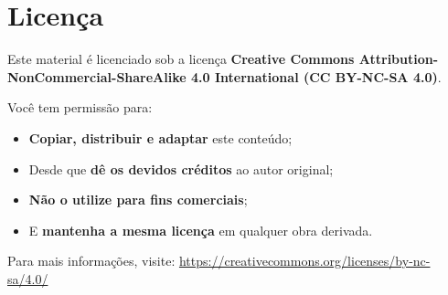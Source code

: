 \documentclass[12pt]{book}
\begin{document}
	\newpage
	\section*{Licença \faCreativeCommons}
	
	Este material é licenciado sob a licença \textbf{Creative Commons Attribution-NonCommercial-ShareAlike 4.0 International (CC BY-NC-SA 4.0)}.
	
	\vspace{1em}
	
	Você tem permissão para:
	
	\begin{itemize}
		\item \textbf{Copiar, distribuir e adaptar} este conteúdo;
		\item Desde que \textbf{dê os devidos créditos} ao autor original;
		\item \textbf{Não o utilize para fins comerciais};
		\item E \textbf{mantenha a mesma licença} em qualquer obra derivada.
	\end{itemize}
	
	\vspace{1em}
	
	Para mais informações, visite:  
	\href{https://creativecommons.org/licenses/by-nc-sa/4.0/}{https://creativecommons.org/licenses/by-nc-sa/4.0/}
	
	\vfill
	
	\begin{center}
		\faCreativeCommons\quad
		\faCreativeCommonsBy\quad
		\faCreativeCommonsNc\quad
		\faCreativeCommonsSa
	\end{center}
	
\end{document}
